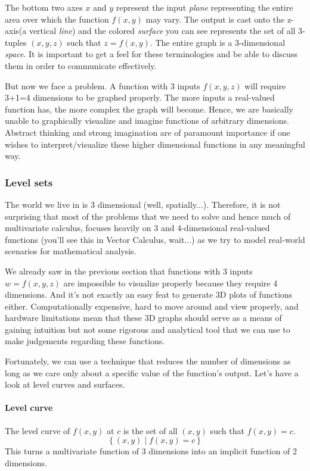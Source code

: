 \documentclass[14pt]{article}
\begin{document}
	The bottom two axes $x$ and $y$ represent the input \textit{plane} representing the entire area over which the function $f(x, y)$ may vary. The output is cast onto the z-axis(a vertical \textit{line}) and the colored \textit{surface} you can see represents the set of all 3-tuples $(x,y,z)$ such that $z = f(x, y)$. The entire graph is a 3-dimensional \textit{space}. It is important to get a feel for these terminologies and be able to discuss them in order to communicate effectively. 
	
	But now we face a problem. A function with 3 inputs $f(x, y, z)$ will require 3+1=4 dimensions to be graphed properly. The more inputs a real-valued function has, the more complex the graph will become. Hence, we are basically unable to graphically visualize and imagine functions of arbitrary dimensions. Abstract thinking and strong imagination are of paramount importance if one wishes to interpret/visualize these higher dimensional functions in any meaningful way. 
	
	\subsubsection{Level sets}
	The world we live in is 3 dimensional {\footnotesize(well, spatially...)}. Therefore, it is not surprising that most of the problems that we need to solve and hence much of multivariate calculus, focuses heavily on 3 and 4-dimensional real-valued functions {\footnotesize (you'll see this in Vector Calculus, wait...)} as we try to model real-world scenarios for mathematical analysis. 
	
	We already saw in the previous section that functions with 3 inputs $w = f(x, y, z)$ are impossible to visualize properly because they require 4 dimensions. And it's not exactly an easy feat to generate 3D plots of functions either. Computationally expensive, hard to move around and view properly, and hardware limitations mean that these 3D graphs should serve as a means of gaining intuition but not some rigorous and analytical tool that we can use to make judgements regarding these functions.
	
	Fortunately, we can use a technique that reduces the number of dimensions as long as we care only about a specific value of the function's output. Let's have a look at level curves and surfaces.
	
	\paragraph{Level curve} The level curve of $f(x, y)$ at $c$ is the set of all $(x, y)$ such that $f(x, y) = c$.
	\begin{equation*}
		\left\{ (x, y) \mid f(x, y) = c \right\} 
	\end{equation*}
	This turns a multivariate function of 3 dimensions into an implicit function of 2 dimensions. 
	
\end{document}
